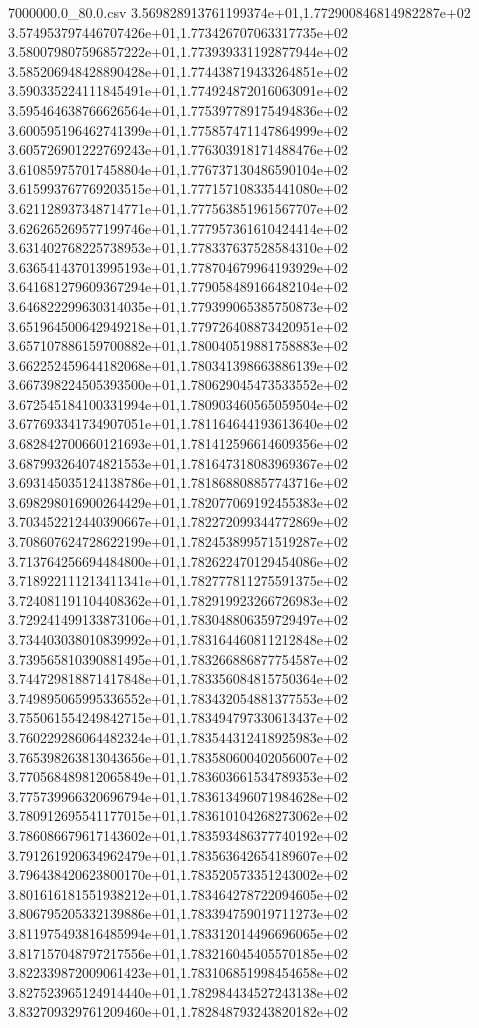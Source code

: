 \begin{filecontents*}{7000000.0_80.0.csv}
3.569828913761199374e+01,1.772900846814982287e+02
3.574953797446707426e+01,1.773426707063317735e+02
3.580079807596857222e+01,1.773939331192877944e+02
3.585206948428890428e+01,1.774438719433264851e+02
3.590335224111845491e+01,1.774924872016063091e+02
3.595464638766626564e+01,1.775397789175494836e+02
3.600595196462741399e+01,1.775857471147864999e+02
3.605726901222769243e+01,1.776303918171488476e+02
3.610859757017458804e+01,1.776737130486590104e+02
3.615993767769203515e+01,1.777157108335441080e+02
3.621128937348714771e+01,1.777563851961567707e+02
3.626265269577199746e+01,1.777957361610424414e+02
3.631402768225738953e+01,1.778337637528584310e+02
3.636541437013995193e+01,1.778704679964193929e+02
3.641681279609367294e+01,1.779058489166482104e+02
3.646822299630314035e+01,1.779399065385750873e+02
3.651964500642949218e+01,1.779726408873420951e+02
3.657107886159700882e+01,1.780040519881758883e+02
3.662252459644182068e+01,1.780341398663886139e+02
3.667398224505393500e+01,1.780629045473533552e+02
3.672545184100331994e+01,1.780903460565059504e+02
3.677693341734907051e+01,1.781164644193613640e+02
3.682842700660121693e+01,1.781412596614609356e+02
3.687993264074821553e+01,1.781647318083969367e+02
3.693145035124138786e+01,1.781868808857743716e+02
3.698298016900264429e+01,1.782077069192455383e+02
3.703452212440390667e+01,1.782272099344772869e+02
3.708607624728622199e+01,1.782453899571519287e+02
3.713764256694484800e+01,1.782622470129454086e+02
3.718922111213411341e+01,1.782777811275591375e+02
3.724081191104408362e+01,1.782919923266726983e+02
3.729241499133873106e+01,1.783048806359729497e+02
3.734403038010839992e+01,1.783164460811212848e+02
3.739565810390881495e+01,1.783266886877754587e+02
3.744729818871417848e+01,1.783356084815750364e+02
3.749895065995336552e+01,1.783432054881377553e+02
3.755061554249842715e+01,1.783494797330613437e+02
3.760229286064482324e+01,1.783544312418925983e+02
3.765398263813043656e+01,1.783580600402056007e+02
3.770568489812065849e+01,1.783603661534789353e+02
3.775739966320696794e+01,1.783613496071984628e+02
3.780912695541177015e+01,1.783610104268273062e+02
3.786086679617143602e+01,1.783593486377740192e+02
3.791261920634962479e+01,1.783563642654189607e+02
3.796438420623800170e+01,1.783520573351243002e+02
3.801616181551938212e+01,1.783464278722094605e+02
3.806795205332139886e+01,1.783394759019711273e+02
3.811975493816485994e+01,1.783312014496696065e+02
3.817157048797217556e+01,1.783216045405570185e+02
3.822339872009061423e+01,1.783106851998454658e+02
3.827523965124914440e+01,1.782984434527243138e+02
3.832709329761209460e+01,1.782848793243820182e+02

\end{filecontents*}
